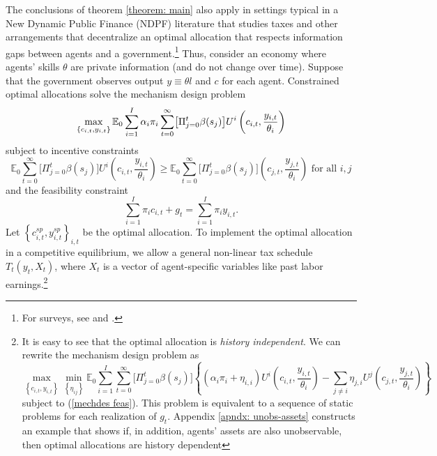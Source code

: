 \documentclass[thmsb,11pt]{article}
\begin{document}
The conclusions  of theorem \ref{theorem: main} also apply in settings typical in  a New Dynamic Public Finance (NDPF)  literature that studies taxes and other arrangements that  decentralize an optimal allocation that respects information gaps between agents and a government.\footnote{%
For surveys, see \citet{golosov2007new} and \cite{kocherlakota2010new}.}
Thus, consider an economy where agents' skills $\theta$ are private information (and do not change over time).  Suppose
that the government observes output $y\equiv \theta l$ and $c$ for each
agent. Constrained optimal allocations solve the mechanism design problem
\begin{equation}
\max_{\left \{ c_{i,t},y_{i,t}\right \} }\mathbb{E}_{0}\sum_{i=1}^{I}\alpha
_{i}\pi _{i}\sum_{t=0}^{\infty } \bigl[\Pi_{j=0}^t \beta(s_j)\bigr] U^{i}\left( c_{i,t},\frac{y_{i,t}}{%
\theta _{i}}\right)  \label{mechdes max}
\end{equation}%
subject to incentive constraints%
\begin{equation}
\mathbb{E}_{0}\sum_{t=0}^{\infty }\bigl[\Pi_{j=0}^t \beta(s_j)\bigr]U^{i}\left( c_{i,t},\frac{y_{i,t}%
}{\theta _{i}}\right) \geq \mathbb{E}_{0}\sum_{t=0}^{\infty }\bigl[\Pi_{j=0}^t \beta(s_j)\bigr]\left( c_{j,t},\frac{y_{j,t}}{\theta _{i}}\right) \text{ for all }%
i,j  \label{mechdes IC}
\end{equation}%
and the feasibility constraint%
\begin{equation}
\sum_{i=1}^{I}\pi _{i}c_{i,t}+g_{t}=\sum_{i=1}^{I}\pi _{i}y_{i,t}.
\label{mechdes feas}
\end{equation}%
Let $\left \{ c_{i,t}^{sp},y_{i,t}^{sp}\right \} _{i,t}$ be the optimal allocation. To implement the optimal allocation
in a competitive equilibrium, we allow a general
non-linear tax schedule $T_{t}\left( y_{t},X_{t}\right) $, where $X_{t}$ is a vector
of  agent-specific variables like past labor earnings.\footnote{It is easy to see that the optimal allocation is \emph{history independent}. We can rewrite the mechanism design problem as
\begin{equation*}
\max_{\left \{ c_{i,t},y_{i,t}\right \} }\min_{\left \{ \eta _{ij}\right \} }%
\mathbb{E}_{0}\sum_{i=1}^{I}\sum_{t=0}^{\infty } \bigl[\Pi_{j=0}^t \beta(s_j)\bigr]\left\{\left( \alpha _{i}\pi _{i}+\eta
_{i,i}\right) U^{i}\left( c_{i,t},\frac{y_{i,t}}{\theta _{i}}\right)
-\sum_{j\neq i}\eta _{j,i}U^{j}\left( c_{j,t},\frac{y_{j,t}}{\theta _{i}}%
\right)\right\}
\end{equation*}%
subject to (\ref{mechdes feas}). This problem is equivalent to a sequence of
static problems for each realization of $g_{t}.$
Appendix \ref{apndx: unobs-assets} constructs an example that shows if, in addition, agents' assets are also unobservable, then optimal allocations are history dependent}
\end{document}

